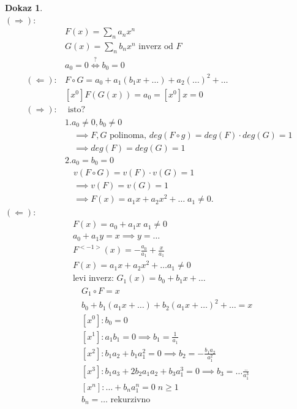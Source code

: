 \documentclass[a4paper, 12pt]{book}
\theoremstyle{definition}
\newtheorem{pro}[counter]{Dokaz}
\theoremstyle{remark}
\begin{document}
\begin{pro} \text{} \\
  $(\Longrightarrow)$:
  \begin{align*}
    &F(x) = \sum_n a_n x^n \\
    &G(x) = \sum_n b_n x^n \text{ inverz od }F \\
    &a_0 = 0 \stackrel{?}{\iff} b_0 = 0 \\
    (\Longleftarrow): &F \circ G = a_0 + a_1(b_1 x + \dots) + a_2(\dots)^2 + \dots \\
    &[x^0] F(G(x)) = a_0 = [x^0] x = 0 \\
    (\Longrightarrow): &\text{ isto?} \\
    &1. a_0 \neq 0, b_0 \neq 0 \\
    &\quad \implies F,G \text{ polinoma, } deg(F \circ g) = deg(F) \cdot deg(G) = 1 \\
    &\quad \implies deg(F) = deg(G) = 1 \\
    &2. a_0 = b_0 = 0 \\
    &\quad v(F \circ G) = v(F) \cdot v(G) = 1 \\
    &\quad \implies v(F) = v(G) = 1 \\
    &\quad \implies F(x) = a_1 x + a_2 x^2 + \dots \; a_1 \neq 0.
  \end{align*}
  $(\Longleftarrow)$:
  \begin{align*}
    &F(x) = a_0 + a_1 x \; a_1 \neq 0 \\
    &a_0 + a_1 y = x \implies y = \dots \\
    &F^{<-1>}(x) = -\frac{a_0}{a_1} + \frac{x}{a_1} \\
    &F(x) = a_1 x + a_2 x^2 + \dots a_1 \neq 0 \\
    &\text{levi inverz: } G_1(x) = b_0 + b_1 x + \dots \\
    &\quad G_1 \circ F = x \\
    &\quad b_0 + b_1 (a_1 x + \dots) + b_2 (a_1 x + \dots)^2 + \dots = x \\
    &\quad [x^0]: b_0 = 0 \\
    &\quad [x^1]: a_1 b_1 = 0 \implies b_1 = \frac{1}{a_1} \\
    &\quad [x^2]: b_1 a_2 + b_1 a_1^2 = 0 \implies b_2 = -\frac{b_1 a_2}{a_1^2} \\
    &\quad [x^3]: b_1 a_3 + 2 b_2 a_1 a_2 + b_3 a_1^3 = 0 \implies b_3 = \dots \frac{..}{a_1^3} \\
    &\quad [x^n]: \dots + b_n a_1^n = 0 \; n \geq 1\\
    &\quad b_n = \dots \text{ rekurzivno} \\

\end{align*}
\end{pro}
\end{document}
